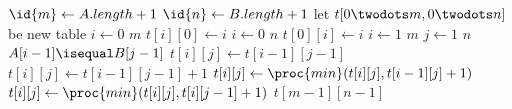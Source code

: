 \begin{codebox}
\li $\id{m} \gets A.length + 1$
\li $\id{n} \gets B.length + 1$
\li let $t[0 \twodots m, 0 \twodots n]$ be new table
\li \For $i \gets 0$ \To $m$ \Do
\li $t[i][0] \gets i$ \End
\li \For $i \gets 0$ \To $n$ \Do
\li $t[0][i] \gets i$ \End
\li \For $i \gets 1$ \To $m$ \Do
\li \For $j \gets 1$ \To $n$ \Do
\li \If $A[i-1] \isequal B[j-1]$ \Then
\li $t[i][j] \gets t[i - 1][j - 1]$
\li \Else
\li $t[i][j] \gets t[i - 1][j - 1] + 1$ \End
\li $t[i][j] \gets \proc{min}(t[i][j],t[i-1][j]+1)$
\li $t[i][j] \gets \proc{min}(t[i][j],t[i][j-1]+1)$ \End \End
\li \Return $t[m - 1][n - 1]$
\end{codebox}
